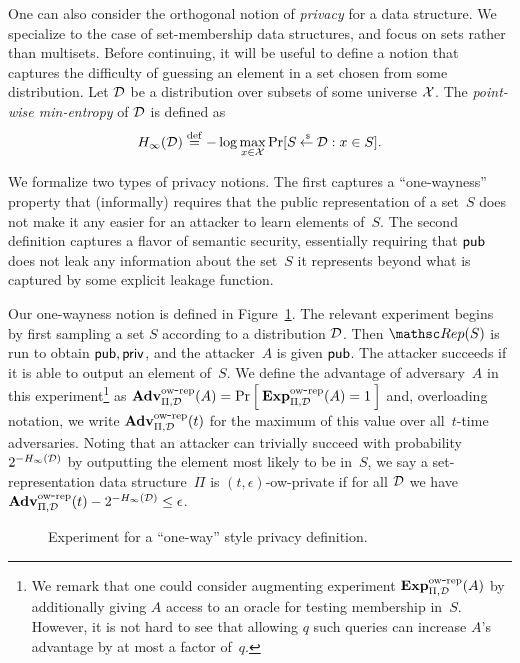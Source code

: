 One can also consider the orthogonal notion of \emph{privacy} for a
data structure.
We specialize to the case of set-membership data structures, and
focus on sets rather than multisets.
Before continuing, it will be useful to define a notion that captures the difficulty
of guessing an element in a set chosen from some distribution.
Let ${\cal D}$ be
a distribution over subsets of some universe ${\cal X}$. The \emph{point-wise
min-entropy} of ${\cal D}$ is defined as
\[H_\infty({\cal D}) \stackrel{\rm def}{=} -\log \max_{x \in {\cal X}} \Pr[S {\:\stackrel{{\scriptscriptstyle \hspace{0.2em}\$}} {\leftarrow}\:} {\cal D} : x \in S].\]



We formalize two types of privacy notions. The first captures
a ``one-wayness'' property that (informally) requires that
the public representation of a set~$S$ does not make it any easier for an attacker
to learn elements of~$S$.
The second definition
captures a flavor of semantic security, essentially requiring that ${\sf pub}$ does
not leak any information about the set~$S$ it represents beyond
what is captured by some explicit leakage function.

Our one-wayness notion is defined in Figure~\ref{fig:privacy-ow}.
The relevant experiment begins by first sampling a set $S$ according to a distribution
${\cal D}$. Then $\Rep(S)$ is run to obtain ${\sf pub},{\sf priv}$, and the attacker~$A$ is given
${\sf pub}$. The attacker succeeds if it is able to output an element of~$S$.
We define the advantage of adversary~$A$ in this experiment\footnote{We
remark that one could consider augmenting experiment $\mathrm{\mathbf{Exp}}^{\mathrm{ow\mbox{-}rep}}_{\Pi,{\cal D}}(A)$ by additionally
giving $A$ access to an oracle for testing membership in~$S$. However, it is not hard
to see that allowing $q$ such queries can increase $A$'s advantage by at most a factor of~$q$.} as
$\mathrm{\mathbf{Adv}}^{\mathrm{ow\mbox{-}rep}}_{\Pi,\mathcal{D}}(A) = \Pr\left[\: \mathrm{\mathbf{Exp}}^{\mathrm{ow\mbox{-}rep}}_{\Pi,{\cal D}}(A)=1 \:\right]$ and,
overloading notation, we write $\mathrm{\mathbf{Adv}}^{\mathrm{ow\mbox{-}rep}}_{\Pi,{\cal D}}(t)$ for the maximum of this value over
all~$t$-time adversaries.
Noting that an attacker can trivially succeed with probability
$2^{-H_\infty({\cal D})}$ by outputting the element most likely to be in~$S$,
we say a
set-representation data structure~$\Pi$ is $(t,\epsilon)$-ow-private if for all ${\cal D}$
we have $\mathrm{\mathbf{Adv}}^{\mathrm{ow\mbox{-}rep}}_{\Pi,{\cal D}}(t) - 2^{-H_\infty({\cal D})} \leq \epsilon$.

\begin{figure}[hbtp]
\centering
{}
\caption{Experiment for a ``one-way'' style privacy
  definition.}
\label{fig:privacy-ow}
\end{figure}


